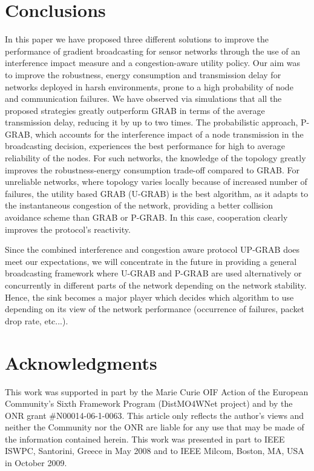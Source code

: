 \documentclass[journal, peerreview, onecolumn, draftcls]{IEEEtran}
\begin{document}
\section{Conclusions}

In this paper we have proposed three different solutions to improve the performance of gradient broadcasting for sensor networks through the use of an interference impact measure and a congestion-aware utility policy. Our aim was to improve the robustness, energy consumption and transmission delay for networks deployed in harsh environments, prone to a high probability of node and communication failures.
We have observed via simulations that all the proposed strategies greatly outperform GRAB in terms of the average transmission delay, reducing it by up to two times.
The probabilistic approach, P-GRAB, which accounts for the interference impact of a node transmission in the broadcasting decision, experiences the best performance for high to average reliability of the nodes. For such networks, the knowledge of the topology greatly improves the robustness-energy consumption trade-off compared to GRAB. For unreliable networks, where topology varies locally because of increased number of failures, the utility based GRAB (U-GRAB) is the best algorithm, as it adapts to the instantaneous congestion of the network, providing a better collision avoidance scheme than GRAB or P-GRAB.
In this case, cooperation clearly improves the protocol's reactivity.

Since the combined interference and congestion aware protocol UP-GRAB does meet our expectations, we will concentrate in the future in providing a general broadcasting framework where U-GRAB and P-GRAB are used alternatively or concurrently in different parts of the network depending on the network stability. Hence, the sink becomes a major player which decides which algorithm to use depending on its view of the network performance (occurrence of failures, packet drop rate, etc...).

\section*{Acknowledgments}
This work was supported in part by the Marie Curie OIF Action of the European Community's Sixth Framework Program (DistMO4WNet project) and by the ONR grant \#N00014-06-1-0063. This article only reflects the author's views and neither the Community nor the ONR are liable for any use that may be made of the information contained herein. This work was
presented in part to IEEE ISWPC, Santorini, Greece in May 2008 and to IEEE Milcom, Boston, MA, USA in October 2009.



\end{document}
